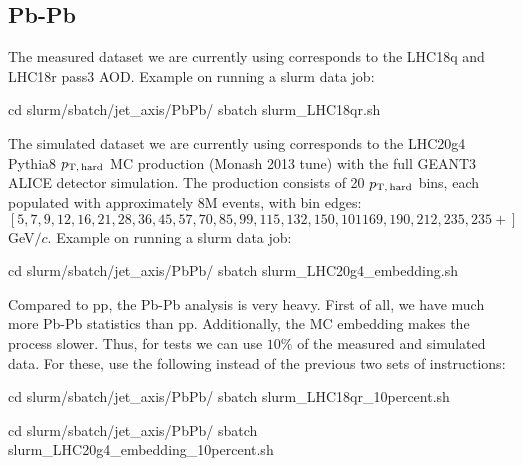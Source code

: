 \documentclass[12pt]{article}
\newcommand{\pThard}{$p_{\rm T, \, hard}$}
\newcommand{\GeVc}{GeV$/c$}
\begin{document}
\subsection{Pb-Pb}

The measured dataset we are currently using corresponds to the LHC18q and LHC18r pass3 AOD.
Example on running a slurm data job:
\begin{tcolorbox}
\begin{verbnobox}[\scriptsize]
cd slurm/sbatch/jet_axis/PbPb/
sbatch slurm_LHC18qr.sh
\end{verbnobox}  
\end{tcolorbox}

The simulated dataset we are currently using corresponds to the LHC20g4 Pythia8 \pThard{} MC production (Monash 2013 tune) with the full
GEANT3 ALICE detector simulation. The production consists of 20 \pThard{} bins, each populated with
approximately 8M events, with bin edges: $[5, 7, 9, 12, 16, 21, 28, 36, 45, 57, 70, 85, 99, 115, 132, 150, 101 169, 190, 212, 235, 235+]$ \GeVc. 
Example on running a slurm data job:
\begin{tcolorbox}
\begin{verbnobox}[\scriptsize]
cd slurm/sbatch/jet_axis/PbPb/
sbatch slurm_LHC20g4_embedding.sh
\end{verbnobox}  
\end{tcolorbox}

Compared to pp, the Pb-Pb analysis is very heavy. First of all, we have much more Pb-Pb statistics than pp. Additionally,
the MC embedding makes the process slower. Thus, for tests we can use $10\%$ of the measured and simulated data.
For these, use the following instead of the previous two sets of instructions:

\begin{tcolorbox}
\begin{verbnobox}[\scriptsize]
cd slurm/sbatch/jet_axis/PbPb/
sbatch slurm_LHC18qr_10percent.sh
\end{verbnobox}  
\end{tcolorbox}

\begin{tcolorbox}
\begin{verbnobox}[\scriptsize]
cd slurm/sbatch/jet_axis/PbPb/
sbatch slurm_LHC20g4_embedding_10percent.sh
\end{verbnobox}  
\end{tcolorbox}

\end{document}
